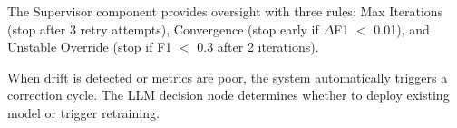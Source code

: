 
The Supervisor component provides oversight with three rules: Max Iterations (stop after 3 retry attempts), Convergence (stop early if $\Delta$F1 $<$ 0.01), and Unstable Override (stop if F1 $<$ 0.3 after 2 iterations).

When drift is detected or metrics are poor, the system automatically triggers a correction cycle. The LLM decision node determines whether to deploy existing model or trigger retraining.